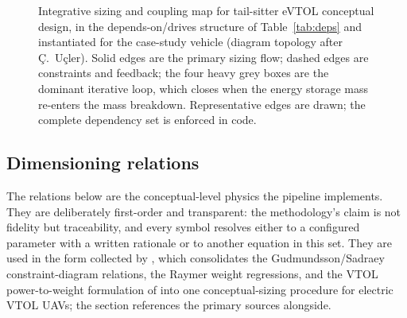 \begin{figure}
{%
}
\caption{Integrative sizing and coupling map for tail-sitter eVTOL
conceptual design, in the depends-on/drives structure of
Table~\ref{tab:deps} and instantiated for the case-study vehicle
(diagram topology after \c{C}.~U\c{c}ler). Solid edges are the primary
sizing flow; dashed edges are constraints and feedback; the four heavy
grey boxes are the dominant iterative loop, which closes when the energy
storage mass re-enters the mass breakdown. Representative edges are
drawn; the complete dependency set is enforced in code.}
\label{fig:coupling}
\end{figure}

\subsection{Dimensioning relations}
\label{sec:equations}

The relations below are the conceptual-level physics the pipeline
implements. They are deliberately first-order and transparent: the
methodology's claim is not fidelity but traceability, and every symbol
resolves either to a configured parameter with a written rationale or
to another equation in this set. They are used in the form collected by
\citet{poelma2024}, which consolidates the Gudmundsson/Sadraey
constraint-diagram relations, the Raymer weight regressions, and the
VTOL power-to-weight formulation of \citet{tyan2017} into one
conceptual-sizing procedure for electric VTOL UAVs; the section
references the primary sources alongside.

